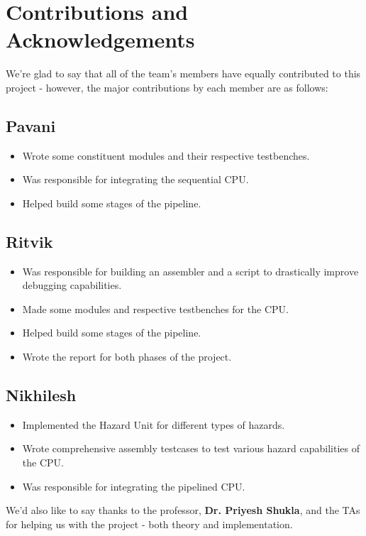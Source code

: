 \documentclass[journal]{IEEEtran}
\begin{document}
\section{Contributions and Acknowledgements}

We're glad to say that all of the team's members have equally contributed to
this project - however, the major contributions by each member are as follows:

\subsection{Pavani}
\begin{itemize}
    \item Wrote some constituent modules and their respective testbenches.
    \item Was responsible for integrating the sequential CPU.
    \item Helped build some stages of the pipeline.
\end{itemize}

\subsection{Ritvik}
\begin{itemize}
    \item Was responsible for building an assembler and a script to drastically
          improve debugging capabilities.
    \item Made some modules and respective testbenches for the CPU.
    \item Helped build some stages of the pipeline.
    \item Wrote the report for both phases of the project.
\end{itemize}

\subsection{Nikhilesh}
\begin{itemize}
    \item Implemented the Hazard Unit for different types of hazards.
    \item Wrote comprehensive assembly testcases to test various hazard capabilities of the CPU.
    \item Was responsible for integrating the pipelined CPU.
\end{itemize}

We'd also like to say thanks to the professor, \textbf{Dr. Priyesh Shukla}, and
the TAs for helping us with the project - both theory and implementation.

\ifCLASSOPTIONcaptionsoff
    \newpage
\fi


\nocite{*}

\end{document}
